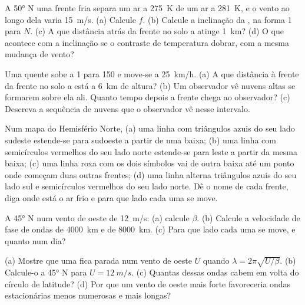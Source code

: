\begin{exercise}[$\star$]\label{exo:b2:weather-systems:1}
A \ang{50} N uma frente fria separa um ar a \qty{275}{K} de um ar a \qty{281}{K}, e o vento
ao longo dela varia \qty{15}{m/s}. (a) Calcule $f$. (b) Calcule a inclinação da ,
na forma 1 para $N$. (c) A que distância atrás da frente no solo a  atinge
\qty{1}{km}? (d) O que acontece com a inclinação se o contraste de temperatura dobrar, com a mesma mudança
de vento?
\end{exercise}

\begin{exercise}[$\star$]\label{exo:b2:weather-systems:2}
Uma  quente sobe a 1 para 150 e move-se a \qty{25}{km/h}. (a) A que distância à frente da
frente no solo a  está a \qty{6}{km} de altura? (b) Um observador vê nuvens altas se formarem
sobre ela ali. Quanto tempo depois a frente chega ao observador? (c) Descreva a sequência de
nuvens que o observador vê nesse intervalo.
\end{exercise}

\begin{exercise}[$\star$]\label{exo:b2:weather-systems:3}
Num mapa do Hemisfério Norte, (a) uma linha com triângulos azuis do seu lado sudeste estende-se para sudoeste
a partir de uma baixa; (b) uma linha com semicírculos vermelhos do seu lado norte estende-se para leste a partir da mesma baixa; (c) uma
linha roxa com os dois símbolos vai de outra baixa até um ponto onde começam duas outras frentes;
(d) uma linha alterna triângulos azuis do seu lado sul e semicírculos vermelhos do seu lado norte.
Dê o nome de cada frente, diga onde está o ar frio e para que lado cada uma se move.
\end{exercise}

\begin{exercise}[$\star$]\label{exo:b2:weather-systems:4}
A \ang{45} N num vento de oeste de \qty{12}{m/s}: (a) calcule $\beta$. (b) Calcule a velocidade de fase
de ondas de \qty{4000}{km} e de \qty{8000}{km}. (c) Para que lado cada uma se move, e quanto num
dia?
\end{exercise}

\begin{exercise}[$\star\star$]\label{exo:b2:weather-systems:5}
(a) Mostre que uma  fica parada num vento de oeste $U$ quando $\lambda = 2\pi\sqrt{U/\beta}$.
(b) Calcule-o a \ang{45} N para $U = \qty{12}{m/s}$. (c) Quantas dessas ondas cabem em volta do
círculo de latitude? (d) Por que um vento de oeste mais forte favoreceria ondas estacionárias menos numerosas e mais longas?
\end{exercise}

